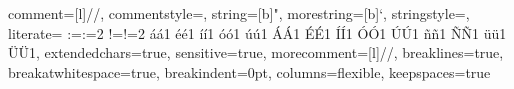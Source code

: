 {  %
  comment=[l]{//},%
  commentstyle={\itshape\color{DimGray}},%
  string=[b]{"},%
  morestring=[b]{`},%
  stringstyle={\color{FireBrick}},%
  literate=%
    {:=}{{:=}}2%
    {!=}{{!=}}2%
    {á}{{\'a}}1 {é}{{\'e}}1 {í}{{\'i}}1 {ó}{{\'o}}1 {ú}{{\'u}}1%
    {Á}{{\'A}}1 {É}{{\'E}}1 {Í}{{\'I}}1 {Ó}{{\'O}}1 {Ú}{{\'U}}1%
    {ñ}{{\~n}}1 {Ñ}{{\~N}}1 {ü}{{\"u}}1 {Ü}{{\"U}}1,%
  extendedchars=true,%
  sensitive=true,%
  morecomment=[l]{//},%
  breaklines=true,%
  breakatwhitespace=true,%
  breakindent=0pt,%
  columns=flexible,%
  keepspaces=true%
}

